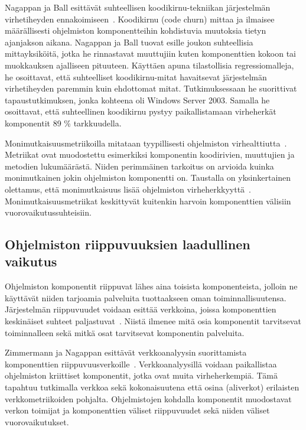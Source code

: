 \documentclass[finnish]{../tktltiki2}
\theoremstyle{definition}
\theoremstyle{remark}
\begin{document}
Nagappan ja Ball esittävät suhteellisen koodikirnu-tekniikan järjestelmän virhetiheyden ennakoimiseen~\cite{NB05}. 
Koodikirnu (code churn) mittaa ja ilmaisee määrällisesti ohjelmiston komponentteihin kohdistuvia muutoksia tietyn 
ajanjakson aikana. Nagappan ja Ball tuovat esille joukon suhteellisia mittayksiköitä, jotka he rinnastavat muuttujiin 
kuten komponenttien kokoon tai muokkauksen ajalliseen pituuteen. Käyttäen apuna tilastollisia regressiomalleja, he 
osoittavat, että suhteelliset koodikirnu-mitat havaitsevat järjestelmän virhetiheyden paremmin kuin ehdottomat mitat. 
Tutkimuksessaan he suorittivat tapaustutkimuksen, jonka kohteena oli Windows Server 2003. Samalla he osoittavat, että 
suhteellinen koodikirnu pystyy paikallistamaan virheherkät komponentit 89 \% tarkkuudella.

    Monimutkaisuusmetriikoilla mitataan tyypillisesti ohjelmiston virhealttiutta~\cite{ZN08}. Metriikat ovat muodostettu 
esimerkiksi komponentin koodirivien, muuttujien ja metodien lukumäärästä. Niiden perimmäinen tarkoitus on arvioida 
kuinka monimutkainen jokin ohjelmiston komponentti on. Taustalla on yksinkertainen olettamus, että monimutkaisuus lisää 
ohjelmiston virheherkkyyttä~\cite{NB05, NB07, ZN08, MNDT09}. Monimutkaisuusmetriikat keskittyvät kuitenkin harvoin 
komponenttien välisiin vuorovaikutussuhteisiin.

\subsection{Ohjelmiston riippuvuuksien laadullinen vaikutus}

    Ohjelmiston komponentit riippuvat lähes aina toisista komponenteista, jolloin ne käyttävät niiden tarjoamia 
palveluita tuottaakseen oman toiminnallisuutensa. Järjestelmän riippuvuudet voidaan esittää verkkoina, 
joissa komponenttien keskinäiset suhteet paljastuvat~\cite{ZN08}. Niistä ilmenee mitä osia komponentit tarvitsevat 
toiminnalleen sekä mitkä osat tarvitsevat komponentin palveluita.

    Zimmermann ja Nagappan esittävät verkkoanalyysin suorittamista komponenttien riippuvuusverkoille~\cite{ZN08}. 
Verkkoanalyysillä voidaan paikallistaa ohjelmiston kriittiset komponentit, jotka ovat muita virheherkempiä. Tämä 
tapahtuu tutkimalla verkkoa sekä kokonaisuutena että osina (aliverkot) erilaisten verkkometriikoiden pohjalta. 
Ohjelmistojen kohdalla komponentit muodostavat verkon toimijat ja komponenttien väliset riippuvuudet sekä niiden väliset 
vuorovaikutukset.
\end{document}
